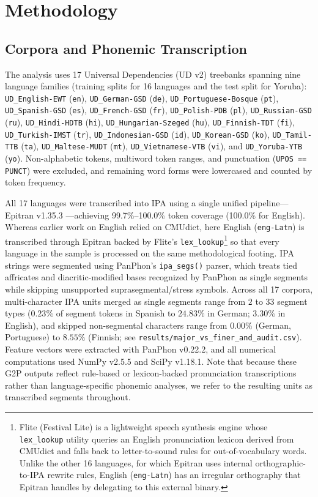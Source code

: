 \documentclass[cm]{glossa}
\begin{document}
\section{Methodology}
\subsection{Corpora and Phonemic Transcription}
The analysis uses 17 Universal Dependencies (UD v2) treebanks \citep{nivre2020universal} spanning nine language families (training splits for 16 languages and the test split for Yoruba): \texttt{UD\_English-EWT} (\texttt{en}), \texttt{UD\_German-GSD} (\texttt{de}), \texttt{UD\_Portuguese-Bosque} (\texttt{pt}), \texttt{UD\_Spanish-GSD} (\texttt{es}), \texttt{UD\_French-GSD} (\texttt{fr}), \texttt{UD\_Polish-PDB} (\texttt{pl}), \texttt{UD\_Russian-GSD} (\texttt{ru}), \texttt{UD\_Hindi-HDTB} (\texttt{hi}), \texttt{UD\_Hungarian-Szeged} (\texttt{hu}), \texttt{UD\_Finnish-TDT} (\texttt{fi}), \texttt{UD\_Turkish-IMST} (\texttt{tr}), \texttt{UD\_Indonesian-GSD} (\texttt{id}), \texttt{UD\_Korean-GSD} (\texttt{ko}), \texttt{UD\_Tamil-TTB} (\texttt{ta}), \texttt{UD\_Maltese-MUDT} (\texttt{mt}), \texttt{UD\_Vietnamese-VTB} (\texttt{vi}), and \texttt{UD\_Yoruba-YTB} (\texttt{yo}). Non-alphabetic tokens, multiword token ranges, and punctuation (\texttt{UPOS == PUNCT}) were excluded, and remaining word forms were lowercased and counted by token frequency.

All 17 languages were transcribed into IPA using a single unified pipeline---Epitran v1.35.3 \citep{mortensen2018epitran}---achieving 99.7\%--100.0\% token coverage (100.0\% for English). Whereas earlier work on English \citep{araujo2013thesis} relied on CMUdict, here English (\texttt{eng-Latn}) is transcribed through Epitran backed by Flite's \texttt{lex\_lookup}\footnote{Flite (Festival Lite) is a lightweight speech synthesis engine whose \texttt{lex\_lookup} utility queries an English pronunciation lexicon derived from CMUdict and falls back to letter-to-sound rules for out-of-vocabulary words. Unlike the other 16 languages, for which Epitran uses internal orthographic-to-IPA rewrite rules, English (\texttt{eng-Latn}) has an irregular orthography that Epitran handles by delegating to this external binary.} so that every language in the sample is processed on the same methodological footing. IPA strings were segmented using PanPhon's \texttt{ipa\_segs()} parser, which treats tied affricates and diacritic-modified bases recognized by PanPhon as single segments while skipping unsupported suprasegmental/stress symbols. Across all 17 corpora, multi-character IPA units merged as single segments range from $2$ to $33$ segment types ($0.23\%$ of segment tokens in Spanish to $24.83\%$ in German; $3.30\%$ in English), and skipped non-segmental characters range from $0.00\%$ (German, Portuguese) to $8.55\%$ (Finnish; see \texttt{results/major\_vs\_finer\_and\_audit.csv}). Feature vectors were extracted with PanPhon v0.22.2, and all numerical computations used NumPy v2.5.5 and SciPy v1.18.1. Note that because these G2P outputs reflect rule-based or lexicon-backed pronunciation transcriptions rather than language-specific phonemic analyses, we refer to the resulting units as transcribed segments throughout.
\end{document}
